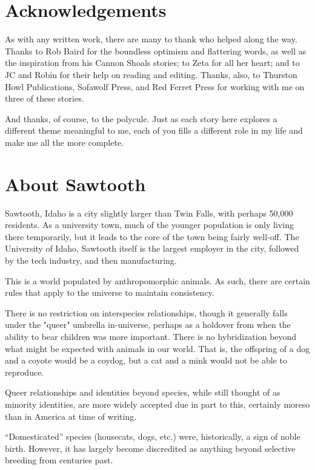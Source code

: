 \chapter*{Acknowledgements}

As with any written work, there are many to thank who helped along the way. Thanks to Rob Baird for the boundless optimism and flattering words, as well as the inspiration from his Cannon Shoals stories; to Zeta for all her heart; and to JC and Robin for their help on reading and editing. Thanks, also, to Thurston Howl Publications, Sofawolf Press, and Red Ferret Press for working with me on three of these stories.

And thanks, of course, to the polycule. Just as each story here explores a different theme meaningful to me, each of you fills a different role in my life and make me all the more complete.

\chapter*{About Sawtooth}

\vspace{0.4cm}

Sawtooth, Idaho is a city slightly larger than Twin Falls, with perhaps 50,000 residents. As a university town, much of the younger population is only living there temporarily, but it leads to the core of the town being fairly well-off. The University of Idaho, Sawtooth itself is the largest employer in the city, followed by the tech industry, and then manufacturing.

This is a world populated by anthropomorphic animals. As such, there are certain rules that apply to the universe to maintain consistency.

There is no restriction on interspecies relationships, though it generally falls under the "queer" umbrella in-universe, perhaps as a holdover from when the ability to bear children was more important. There is no hybridization beyond what might be expected with animals in our world. That is, the offspring of a dog and a coyote would be a coydog, but a cat and a mink would not be able to reproduce.

Queer relationships and identities beyond species, while still thought of as minority identities, are more widely accepted due in part to this, certainly moreso than in America at time of writing.\newpage

``Domesticated'' species (housecats, dogs, etc.) were, historically, a sign of noble birth. However, it has largely become discredited as anything beyond selective breeding from centuries past.

